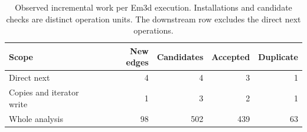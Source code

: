 \begin{table}[t]
\centering
\small
\caption{Observed incremental work per Em3d execution. Installations and candidate checks are distinct operation units. The downstream row excludes the direct next operations.}
\label{tab:em3d-repair}
\begin{tabular}{lrrrr}
\toprule
\textbf{Scope} & \textbf{New edges} & \textbf{Candidates} & \textbf{Accepted} & \textbf{Duplicate} \\
\midrule
Direct next & 4 & 4 & 3 & 1 \\
Copies and iterator write & 1 & 3 & 2 & 1 \\
Whole analysis & 98 & 502 & 439 & 63 \\
\bottomrule
\end{tabular}
\end{table}
